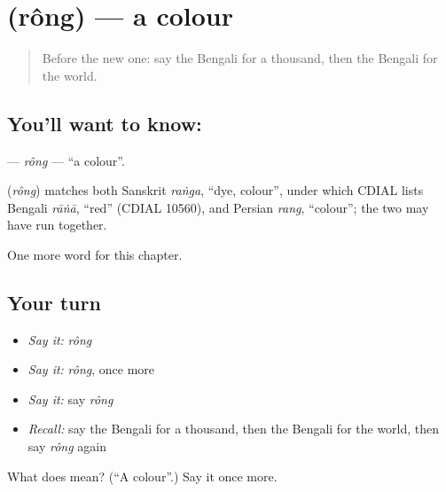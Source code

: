 \section[\texorpdfstring{\bn{রং} (rông)}{রং (rông)}]{ (rông) — a colour}

\label{lesson:BN-C88-rong}



\begin{quote}
Before the new one: say the Bengali for a thousand, then the Bengali for the world.
\end{quote}

\subsection*{You'll want to know: }
\textbf{} — \emph{rông} — \textquotedblleft{}a colour\textquotedblright{}.

\begin{cousinweb}
\textbf{} (\emph{rông}) matches both Sanskrit \emph{raṅga}, \textquotedblleft{}dye, colour\textquotedblright{}, under which CDIAL lists Bengali \emph{rāṅā}, \textquotedblleft{}red\textquotedblright{} (CDIAL 10560), and Persian \emph{rang}, \textquotedblleft{}colour\textquotedblright{}; the two may have run together.
\end{cousinweb}

\begin{grammarlens}[title={What you've built}]
One more word for this chapter.
\end{grammarlens}

\subsection*{Your turn}
\begin{itemize}
\raggedright
  \item \emph{Say it:} \emph{rông}
  \item \emph{Say it:} \emph{rông}, once more
  \item \emph{Say it:} say \emph{rông}
  \item \emph{Recall:} say the Bengali for a thousand, then the Bengali for the world, then say \emph{rông} again
\end{itemize}

\begin{tcolorbox}[breakable,colback=teal!4,colframe=teal!35!black,title={Before you move on}]
What does  mean? (\textquotedblleft{}A colour\textquotedblright{}.) Say it once more.
\end{tcolorbox}

